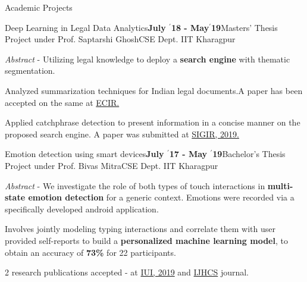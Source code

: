 \documentclass{resume} %
\begin{document}
\begin{rSection}{Academic Projects}

\begin{rSubsection}{ \large Deep Learning in Legal Data Analytics}{\textbf{\large July $^{\prime}$18 - May$^{\prime}$19}}{Masters' Thesis Project under Prof. Saptarshi Ghosh}{CSE Dept. IIT Kharagpur}
\item \textit{Abstract} - Utilizing legal knowledge to deploy a \textbf{search engine} with thematic segmentation.
\item Analyzed summarization techniques for Indian legal documents.A paper has been accepted on the same at \href{http://ecir2019.org}{ECIR.}
\item Applied catchphrase detection to present information in a concise manner on the proposed search engine. A paper was submitted at \href{http://sigir.org/sigir2019/}{SIGIR, 2019.}
\end{rSubsection}

\begin{rSubsection}{ \large Emotion detection using smart devices}{\textbf{\large July $^{\prime}$17 - May $^{\prime}$19}}{Bachelor's Thesis Project under Prof. Bivas Mitra}{CSE Dept. IIT Kharagpur}
\item \textit{Abstract} - We investigate the role of both types of touch interactions in \textbf{multi-state emotion detection} for a generic context. Emotions were recorded via a specifically developed android application.

\item Involves jointly modeling typing interactions and correlate them with user provided self-reports to build a \textbf{personalized machine learning model}, to obtain an accuracy of \textbf{73\%} for 22 participants.

\item 2 research publications accepted - at \href{https://iui.acm.org/2019}{IUI, 2019} and \href{https://www.journals.elsevier.com/international-journal-of-human-computer-studies}{IJHCS} journal.
\end{rSubsection}


\end{rSection}
\end{document}
